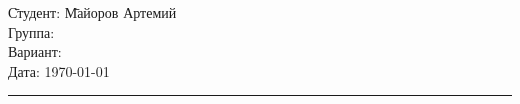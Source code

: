 \begin{tabbing}
	\hspace{11cm} \= Студент: \= Майоров Артемий \\																			
	\> Группа:  \\
	\> Вариант:  \\	
	\> Дата: \> \today
\end{tabbing}
\hrule
\vspace{1cm}